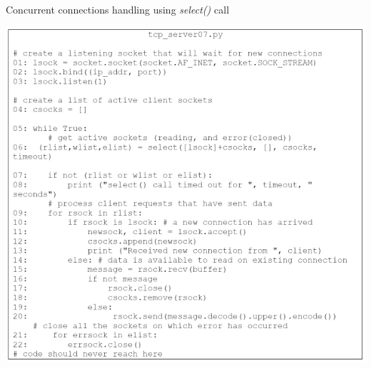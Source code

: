 \begin{table}[H]
\centering
\caption{Concurrent connections handling using \textit{select()} call}\label{tab12}
\includegraphics[scale=3.5]{src/Figures/chap1/tab12.jpg}
\end{table}


